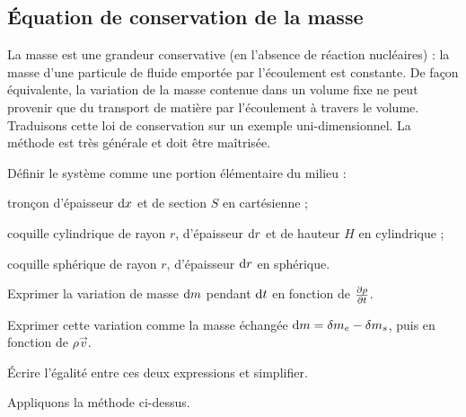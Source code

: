 \documentclass[12pt,fancy]{cours}
\begin{document}
\subsection{Équation de conservation de la masse}

La masse est une grandeur conservative (en l'absence de réaction nucléaires) : la masse d'une particule de fluide emportée par l'écoulement est constante. De façon équivalente, la variation de la masse contenue dans un volume fixe ne peut provenir que du transport de matière par l'écoulement à travers le volume. %
Traduisons cette loi de conservation sur un exemple uni-dimensionnel. La méthode est très générale et doit être maîtrisée.


\begin{methode}
  \item Définir le système comme une portion élémentaire du milieu :
  \begin{liste}
    \item tronçon d'épaisseur $\mathrm{d} x$ et de section $S$ en cartésienne ;
    \item coquille cylindrique de rayon $r$, d'épaisseur $\mathrm{d} r$ et de hauteur $H$ en cylindrique ;
    \item coquille sphérique de rayon $r$, d'épaisseur $\mathrm{d} r$ en sphérique.
  \end{liste}
  \item Exprimer la variation de masse $\mathrm{d} m$ pendant $\mathrm{d} t$ en fonction de $\frac{\partial{\rho}}{\partial{t}}$.
  \item Exprimer cette variation comme la masse échangée $\mathrm{d} m = \delta m_{e} - \delta m_s$, puis en fonction de $\rho \Vec{v}$.
  \item Écrire l’égalité entre ces deux expressions et simplifier.
\end{methode}


 Appliquons la méthode ci-dessus.
\end{document}
